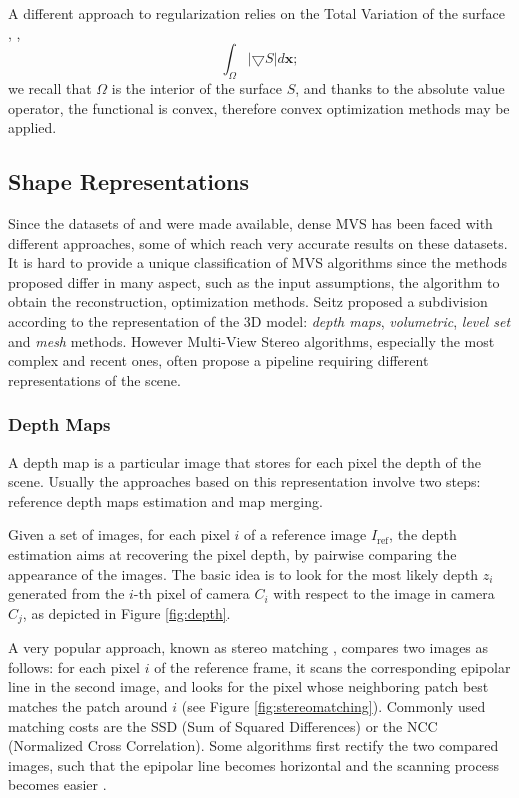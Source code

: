 
A different approach to regularization relies on the Total Variation of the surface \cite{chambolle2010introduction}, \ie, 
\[
\int_{\mathit{\Omega}}|\bigtriangledown \mathit{S}|d\mathbf{x};
\]
we recall that  $\mathit{\Omega}$ is the interior of the surface $\mathit{S}$, and thanks to the absolute value operator, the functional is convex, therefore convex optimization methods may be applied.



\subsection{Shape Representations}
Since the datasets of \cite{seitz_et_al06} and \cite{strecha2008} were made available, dense MVS has been faced with different approaches, some of which reach very accurate results on these datasets.
It is hard to provide a unique classification of MVS algorithms since the methods proposed differ in many aspect, such as the input assumptions, the algorithm to obtain the reconstruction, optimization methods. 
Seitz \etal \cite{seitz_et_al06} proposed a subdivision according to the representation of the 3D model: \emph{depth maps}, \emph{volumetric},  \emph{level set} and \emph{mesh} methods. 
However Multi-View Stereo algorithms, especially the most complex and recent ones, often propose a pipeline requiring different representations of the scene.

\subsubsection{Depth Maps}
A depth map is a particular image that stores for each pixel the depth of the scene.
Usually the approaches based on this representation involve two steps: reference depth maps estimation and map merging.

Given a set of images, for each pixel $i$ of a reference image $I_{\text{ref}}$, the depth estimation aims at recovering the pixel depth, by pairwise comparing the appearance of the images. 
The basic idea is to look for the most likely depth $z_i$ generated from the $i$-th pixel of camera $C_i$ with respect to the image in camera $C_j$, as depicted in Figure \ref{fig:depth}.

A very popular approach, known as stereo matching \cite{scharstein2002taxonomy,lhuillier2002match}, compares two images as follows: for each pixel $i$ of the reference frame, it scans the corresponding epipolar line in the second image, and looks for the pixel whose neighboring patch best matches the patch around $i$ (see Figure \ref{fig:stereomatching}). 
Commonly used matching costs are the SSD (Sum of Squared Differences) or the NCC (Normalized Cross Correlation).
Some algorithms first rectify the two compared images, such that the epipolar line becomes horizontal and the scanning process becomes easier 
\cite{kang2001handling,bradley2008accurate,moons20093d}. 



